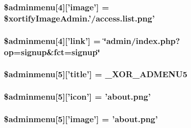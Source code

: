 \hypertarget{menu_8php_aab8f8f168350fdbc929c79d6f8e6564c}{
\subsubsection[{\$adminmenu}]{\setlength{\rightskip}{0pt plus 5cm}\$adminmenu\mbox{[}4\mbox{]}\mbox{[}'image'\mbox{]} = \$xortify\-Image\-Admin.'/access.\-list.\-png'}}\label{menu_8php_aab8f8f168350fdbc929c79d6f8e6564c}
\hypertarget{menu_8php_a076adc5338eb254a63b2e2d679087482}{
\subsubsection[{\$adminmenu}]{\setlength{\rightskip}{0pt plus 5cm}\$adminmenu\mbox{[}4\mbox{]}\mbox{[}'link'\mbox{]} = \char`\"{}admin/index.\-php?op=signup\&fct=signup\char`\"{}}}\label{menu_8php_a076adc5338eb254a63b2e2d679087482}
\hypertarget{menu_8php_a014e06ed36a394774cc2f03aa232a072}{
\subsubsection[{\$adminmenu}]{\setlength{\rightskip}{0pt plus 5cm}\$adminmenu\mbox{[}5\mbox{]}\mbox{[}'title'\mbox{]} = {\bf \-\_\-\-X\-O\-R\-\_\-\-A\-D\-M\-E\-N\-U5}}}\label{menu_8php_a014e06ed36a394774cc2f03aa232a072}
\hypertarget{menu_8php_aadc33c1b4aea642afa84d339642b4844}{
\subsubsection[{\$adminmenu}]{\setlength{\rightskip}{0pt plus 5cm}\$adminmenu\mbox{[}5\mbox{]}\mbox{[}'icon'\mbox{]} = 'about.\-png'}}\label{menu_8php_aadc33c1b4aea642afa84d339642b4844}
\hypertarget{menu_8php_a2aba67319256287d166fc8ebfa4bede6}{
\subsubsection[{\$adminmenu}]{\setlength{\rightskip}{0pt plus 5cm}\$adminmenu\mbox{[}5\mbox{]}\mbox{[}'image'\mbox{]} = 'about.\-png'}}\label{menu_8php_a2aba67319256287d166fc8ebfa4bede6}
